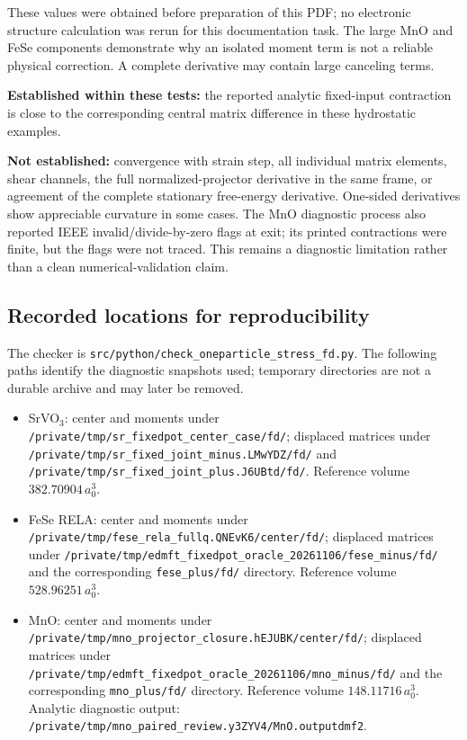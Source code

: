 \documentclass[11pt]{article}
\newcommand{\pathf}[1]{\nolinkurl{#1}}
\begin{document}
These values were obtained before preparation of this PDF; no electronic
structure calculation was rerun for this documentation task.
The large MnO and FeSe components demonstrate why an isolated moment
term is not a reliable physical correction. A complete derivative may
contain large canceling terms.

\textbf{Established within these tests:} the reported analytic
fixed-input contraction is close to the corresponding central matrix
difference in these hydrostatic examples.

\textbf{Not established:} convergence with strain step, all individual
matrix elements, shear channels, the full normalized-projector
derivative in the same frame, or agreement of the complete stationary
free-energy derivative. One-sided derivatives show appreciable curvature
in some cases. The MnO diagnostic process also reported IEEE
invalid/divide-by-zero flags at exit; its printed contractions were
finite, but the flags were not traced. This remains a diagnostic
limitation rather than a clean numerical-validation claim.

\subsection{Recorded locations for reproducibility}
The checker is
\pathf{src/python/check_oneparticle_stress_fd.py}.
The following paths identify the diagnostic snapshots used; temporary
directories are not a durable archive and may later be removed.
\begin{itemize}[itemsep=4pt]
\item SrVO$_3$: center and moments under
 \pathf{/private/tmp/sr_fixedpot_center_case/fd/}; displaced matrices under
 \pathf{/private/tmp/sr_fixed_joint_minus.LMwYDZ/fd/} and
 \pathf{/private/tmp/sr_fixed_joint_plus.J6UBtd/fd/}.
 Reference volume $382.70904\,a_0^3$.
\item FeSe RELA: center and moments under
 \pathf{/private/tmp/fese_rela_fullq.QNEvK6/center/fd/}; displaced
 matrices under
 \pathf{/private/tmp/edmft_fixedpot_oracle_20261106/fese_minus/fd/}
 and the corresponding \pathf{fese_plus/fd/} directory.
 Reference volume $528.96251\,a_0^3$.
\item MnO: center and moments under
 \pathf{/private/tmp/mno_projector_closure.hEJUBK/center/fd/}; displaced
 matrices under
 \pathf{/private/tmp/edmft_fixedpot_oracle_20261106/mno_minus/fd/}
 and the corresponding \pathf{mno_plus/fd/} directory.
 Reference volume $148.11716\,a_0^3$.
 Analytic diagnostic output:
 \pathf{/private/tmp/mno_paired_review.y3ZYV4/MnO.outputdmf2}.
\end{itemize}
\end{document}
